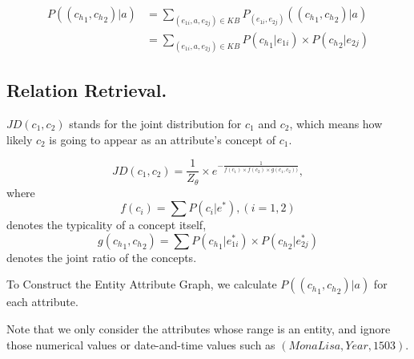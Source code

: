 \begin{equation} \begin{split} P(({c_h}_{1},{c_h}_{2}) |a) &= \sum_{  (e_{1i},a,e_{2j})\in KB } P_{(e_{1i},e_{2j})}(({c_h}_{1},{c_h}_{2}) |a) \\&=  \sum_{  (e_{1i},a,e_{2j})\in KB }P({c_h}_{1}|e_{1i}) \times P({c_h}_{2}|e_{2j})\end{split} \label{eq:gga_fin}\end{equation}





\subsection{ Relation Retrieval.}


$JD(c_1,c_2)$ stands for the joint distribution for $c_1$ and $c_2$, which means how likely $c_2$ is going to appear as an attribute's concept of $c_1$.

\begin{definition}[Definition of $s(c_1,c_2)$]

  $$ JD(c_1,c_2) = \frac{1}{Z_\theta}\times e^{- \frac{1}{f(c_1)\times f(c_2)\times g(c_1,c_2))}},$$
  where $$f(c_i)=\sum{ P(c_i|e^*) },(i=1,2)$$
  denotes the typicality of a concept itself, $$g({c_h}_1 ,{c_h}_2 )=\sum P({c_h}_{1}|e_{1i}^*) \times P({c_h}_{2}|e_{2j}^*)$$
  denotes the joint ratio of the concepts.


\end{definition}





To Construct the Entity Attribute Graph, we calculate $P(({c_h}_{1},{c_h}_{2}) |a)$ for each attribute.




Note that we only consider the attributes whose range is an entity, and ignore those numerical values or date-and-time values such as $( Mona Lisa, Year, 1503)$.






